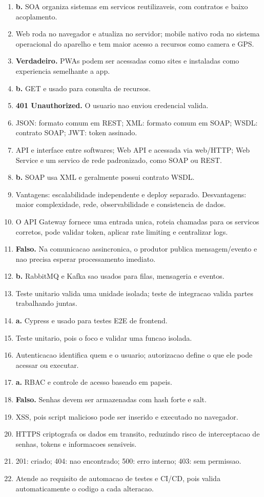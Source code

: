 \documentclass[12pt,a4paper]{article}
\begin{document}
\begin{enumerate}
  \item \textbf{b.} SOA organiza sistemas em servicos reutilizaveis, com contratos e baixo acoplamento.
  \item Web roda no navegador e atualiza no servidor; mobile nativo roda no sistema operacional do aparelho e tem maior acesso a recursos como camera e GPS.
  \item \textbf{Verdadeiro.} PWAs podem ser acessadas como sites e instaladas como experiencia semelhante a app.
  \item \textbf{b.} GET e usado para consulta de recursos.
  \item \textbf{401 Unauthorized.} O usuario nao enviou credencial valida.
  \item JSON: formato comum em REST; XML: formato comum em SOAP; WSDL: contrato SOAP; JWT: token assinado.
  \item API e interface entre softwares; Web API e acessada via web/HTTP; Web Service e um servico de rede padronizado, como SOAP ou REST.
  \item \textbf{b.} SOAP usa XML e geralmente possui contrato WSDL.
  \item Vantagens: escalabilidade independente e deploy separado. Desvantagens: maior complexidade, rede, observabilidade e consistencia de dados.
  \item O API Gateway fornece uma entrada unica, roteia chamadas para os servicos corretos, pode validar token, aplicar rate limiting e centralizar logs.
  \item \textbf{Falso.} Na comunicacao assincronica, o produtor publica mensagem/evento e nao precisa esperar processamento imediato.
  \item \textbf{b.} RabbitMQ e Kafka sao usados para filas, mensageria e eventos.
  \item Teste unitario valida uma unidade isolada; teste de integracao valida partes trabalhando juntas.
  \item \textbf{a.} Cypress e usado para testes E2E de frontend.
  \item Teste unitario, pois o foco e validar uma funcao isolada.
  \item Autenticacao identifica quem e o usuario; autorizacao define o que ele pode acessar ou executar.
  \item \textbf{a.} RBAC e controle de acesso baseado em papeis.
  \item \textbf{Falso.} Senhas devem ser armazenadas com hash forte e salt.
  \item XSS, pois script malicioso pode ser inserido e executado no navegador.
  \item HTTPS criptografa os dados em transito, reduzindo risco de interceptacao de senhas, tokens e informacoes sensiveis.
  \item 201: criado; 404: nao encontrado; 500: erro interno; 403: sem permissao.
  \item Atende ao requisito de automacao de testes e CI/CD, pois valida automaticamente o codigo a cada alteracao.
\end{enumerate}
\end{document}
